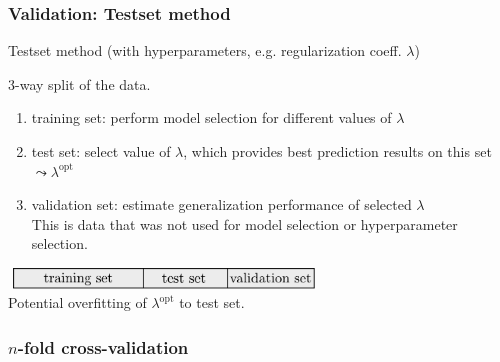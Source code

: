 \begin{frame}\frametitle{Validation: Testset method}
	
	\begin{block}{Testset method (with hyperparameters, e.g. regularization coeff. $\lambda$)}
	
	3-way split of the data.
	
		\begin{enumerate}
		  \item training set: perform model selection for different values of $\lambda$
		  \item test set: select value of $\lambda $, 
		  		which provides best prediction results on this set $\leadsto \lambda^{\mathrm{opt}}$
		  \item validation set: estimate generalization performance of selected $\lambda$\\
		  This is data that was not used for model selection or hyperparameter selection.
		\end{enumerate}
	\end{block}	
	
	\vspace{1cm} 
	
	$ $\hspace{1cm}
	\includegraphics[width=8cm]{img/traintestvalidation.pdf} \\
	
	Potential overfitting of $\lambda^{\mathrm{opt}}$ to test set.
\end{frame}

\subsubsection{$n$-fold cross-validation}

